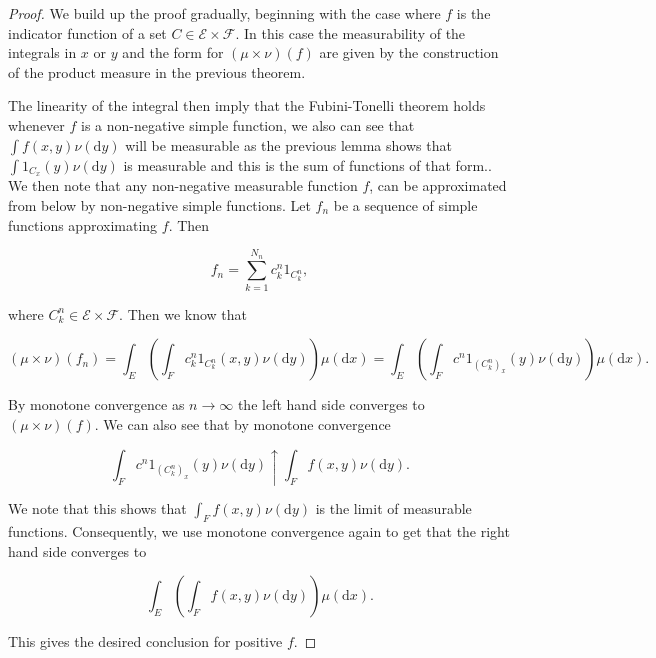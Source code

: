 \documentclass[
]{book}
\theoremstyle{definition}
\theoremstyle{definition}
\theoremstyle{definition}
\theoremstyle{definition}
\theoremstyle{remark}
\begin{document}
\begin{proof}
We build up the proof gradually, beginning with the case where \(f\) is the indicator function of a set \(C \in \mathcal{E} \times \mathcal{F}\). In this case the measurability of the integrals in \(x\) or \(y\) and the form for \((\mu \times \nu)(f)\) are given by the construction of the product measure in the previous theorem.

The linearity of the integral then imply that the Fubini-Tonelli theorem holds whenever \(f\) is a non-negative simple function, we also can see that \(\int f(x,y) \nu(\mathrm{d}y)\) will be measurable as the previous lemma shows that \(\int 1_{C_x}(y) \nu(\mathrm{d}y)\) is measurable and this is the sum of functions of that form.. We then note that any non-negative measurable function \(f\), can be approximated from below by non-negative simple functions. Let \(f_n\) be a sequence of simple functions approximating \(f\). Then

\[ f_n = \sum_{k=1}^{N_n} c^n_k 1_{C^n_k}, \]

where \(C^n_k \in \mathcal{E} \times \mathcal{F}\). Then we know that

\[ (\mu \times \nu)(f_n) = \int_E \left( \int_F c^n_k 1_{C^n_k}(x,y) \nu(\mathrm{d}y) \right) \mu(\mathrm{d}x) = \int_E \left( \int_F c^n 1_{(C^n_k)_x}(y) \nu(\mathrm{d}y) \right)\mu(\mathrm{d}x). \]

By monotone convergence as \(n \rightarrow \infty\) the left hand side converges to \((\mu \times \nu)(f)\). We can also see that by monotone convergence

\[ \int_F c^n 1_{(C^n_k)_x}(y) \nu(\mathrm{d}y) \uparrow \int_F f(x,y) \nu(\mathrm{d}y). \]

We note that this shows that \(\int_F f(x,y) \nu(\mathrm{d}y)\) is the limit of measurable functions. Consequently, we use monotone convergence again to get that the right hand side converges to

\[ \int_E \left( \int_F f(x,y) \nu(\mathrm{d}y) \right) \mu(\mathrm{d}x). \]

This gives the desired conclusion for positive \(f\).
\end{proof}
\end{document}
